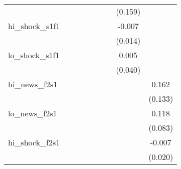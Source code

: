 {\begin{tabular}{l*{8}{c}}
            &                     &                     &                     &                     &                     &                     &     (0.159)         &                     \\
\addlinespace
hi\_shock\_s1f1&                     &                     &                     &                     &                     &                     &      -0.007         &                     \\
            &                     &                     &                     &                     &                     &                     &     (0.014)         &                     \\
\addlinespace
lo\_shock\_s1f1&                     &                     &                     &                     &                     &                     &       0.005         &                     \\
            &                     &                     &                     &                     &                     &                     &     (0.040)         &                     \\
\addlinespace
hi\_news\_f2s1&                     &                     &                     &                     &                     &                     &                     &       0.162         \\
            &                     &                     &                     &                     &                     &                     &                     &     (0.133)         \\
\addlinespace
lo\_news\_f2s1&                     &                     &                     &                     &                     &                     &                     &       0.118         \\
            &                     &                     &                     &                     &                     &                     &                     &     (0.083)         \\
\addlinespace
hi\_shock\_f2s1&                     &                     &                     &                     &                     &                     &                     &      -0.007         \\
            &                     &                     &                     &                     &                     &                     &                     &     (0.020)         \\

\end{tabular}}
